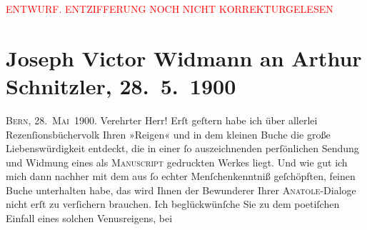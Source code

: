 
\begin{center}
            \textcolor{red}{ENTWURF. ENTZIFFERUNG NOCH NICHT KORREKTURGELESEN}
                      \end{center}
            
               \section[Joseph Victor Widmann an Arthur Schnitzler, 28. 5. 1900]{ Joseph Victor Widmann an Arthur Schnitzler, 28. 5. 1900}\nopagebreak{}\rehead{ }\begin{ledgroupsized}[t]{13cm}\normalsize\beginnumbering{} \toendnotes[C]{\smallbreak\pagebreak[2]} 
\toendnotes[C]{\smallbreak}\pstart
           \raggedleft{}{\pb}\textsc{Bern, 28. Mai 1900}.\pend
           \pstart{}Verehrter Herr!\pend\pstart
           Erſt geſtern habe ich über allerlei Rezenſionsbüchervolk Ihren »Reigen« und in dem kleinen Buche die große
                    Liebenswürdigkeit entdeckt, die in einer ſo auszeichnenden perſönlichen {\pb}Sendung und Widmung eines als \textsc{Manuscript} gedruckten Werkes liegt.\pend
           \pstart
           Und wie gut ich mich dann nachher mit dem aus ſo echter Menſchenkenntniß
                    geſchöpften, feinen Buche unterhalten habe, das wird Ihnen der Bewunderer Ihrer \textsc{Anatole}-Dialoge nicht erſt zu verſichern brauchen.\pend
           \pstart
           Ich beglückwünſche Sie zu dem poetiſchen Einfall eines solchen Venusreigens, bei

\end{ledgroupsized}
